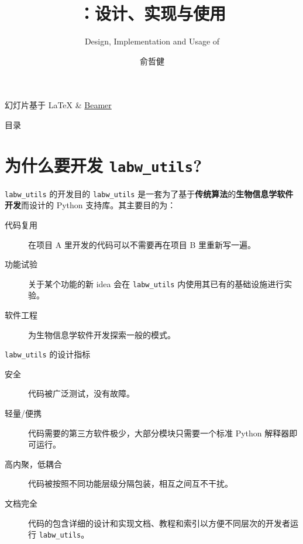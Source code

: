 \documentclass[pdf,9pt]{beamer}
\title{\lu：设计、实现与使用}
\subtitle{Design, Implementation and Usage of \lu}
\author{俞哲健}
\newcommand{\lu}{\texttt{labw\_utils}}
\begin{document}

    \begin{frame}
        \titlepage

        幻灯片基于 \LaTeX{} \& \href{https://latex-beamer.com/}{Beamer}
    \end{frame}

    \begin{frame}{目录}
        \tableofcontents[hideallsubsections]
    \end{frame}


    \section{为什么要开发 \lu{}?}

    \begin{frame}
        \sectionpage
    \end{frame}

    \begin{frame}{\lu{} 的开发目的}
        \lu{} 是一套为了基于\textbf{传统算法}的\textbf{生物信息学软件开发}而设计的 Python 支持库。其主要目的为：

        \begin{description}
            \item[代码复用] 在项目 A 里开发的代码可以不需要再在项目 B 里重新写一遍。
            \item[功能试验] 关于某个功能的新 idea 会在 \lu{} 内使用其已有的基础设施进行实验。
            \item[软件工程] 为生物信息学软件开发探索一般的模式。
        \end{description}
    \end{frame}

    \begin{frame}{\lu{} 的设计指标}
        \begin{description}
            \item[安全] 代码被广泛测试，没有故障。
            \item[轻量/便携] 代码需要的第三方软件极少，大部分模块只需要一个标准 Python 解释器即可运行。
            \item[高内聚，低耦合] 代码被按照不同功能层级分隔包装，相互之间互不干扰。
            \item[文档完全] 代码的包含详细的设计和实现文档、教程和索引以方便不同层次的开发者运行 \lu{}。
        \end{description}
    \end{frame}
\end{document}
